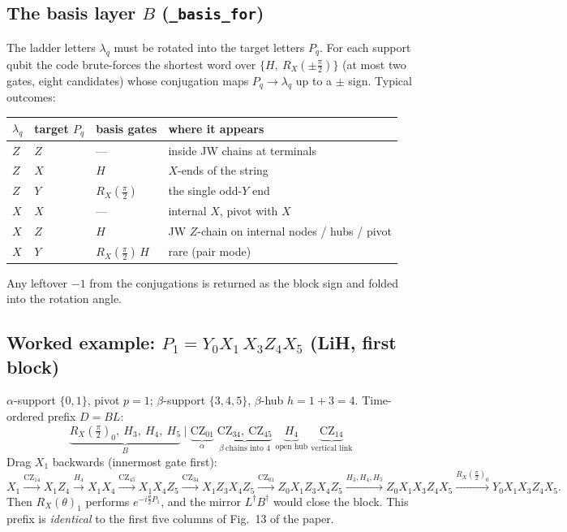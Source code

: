 \documentclass[11pt]{article}
\newcommand{\RX}{R_X}
\newcommand{\CZ}{\mathrm{CZ}}
\newcommand{\code}[1]{\texttt{#1}}
\begin{document}
\subsection{The basis layer $B$ (\code{\_basis\_for})}
The ladder letters $\lambda_q$ must be rotated into the target letters
$P_q$. For each support qubit the code brute-forces the shortest word
over $\{H,\ \RX(\pm\frac{\pi}{2})\}$ (at most two gates, eight
candidates) whose conjugation maps $P_q \to \lambda_q$ up to a $\pm$
sign. Typical outcomes:
\begin{center}
\begin{tabular}{llll}
\toprule
$\lambda_q$ & target $P_q$ & basis gates & where it appears\\
\midrule
$Z$ & $Z$ & --- & inside JW chains at terminals\\
$Z$ & $X$ & $H$ & $X$-ends of the string\\
$Z$ & $Y$ & $\RX(\frac{\pi}{2})$ & the single odd-$Y$ end\\
$X$ & $X$ & --- & internal $X$, pivot with $X$\\
$X$ & $Z$ & $H$ & JW $Z$-chain on internal nodes / hubs / pivot\\
$X$ & $Y$ & $\RX(\frac{\pi}{2})\,H$ & rare (pair mode)\\
\bottomrule
\end{tabular}
\end{center}
Any leftover $-1$ from the conjugations is returned as the block sign and
folded into the rotation angle.

\subsection{Worked example: $P_1 = Y_0X_1\,X_3Z_4X_5$ (LiH, first block)}
$\alpha$-support $\{0,1\}$, pivot $p=1$; $\beta$-support $\{3,4,5\}$,
$\beta$-hub $h=1+3=4$. Time-ordered prefix $D=BL$:
\begin{equation*}
\underbrace{\RX(\tfrac{\pi}{2})_0,\ H_3,\ H_4,\ H_5}_{B}\;\Big|\;
\underbrace{\CZ_{01}}_{\alpha}\;
\underbrace{\CZ_{34},\ \CZ_{45}}_{\beta\ \text{chains into }4}\;
\underbrace{H_4}_{\text{open hub}}\;
\underbrace{\CZ_{14}}_{\text{vertical link}}
\end{equation*}
Drag $X_1$ backwards (innermost gate first):
\begin{equation*}
X_1
\xrightarrow{\CZ_{14}} X_1Z_4
\xrightarrow{H_4} X_1X_4
\xrightarrow{\CZ_{45}} X_1X_4Z_5
\xrightarrow{\CZ_{34}} X_1Z_3X_4Z_5
\xrightarrow{\CZ_{01}} Z_0X_1Z_3X_4Z_5
\xrightarrow{H_3,H_4,H_5} Z_0X_1X_3Z_4X_5
\xrightarrow{\RX(\frac{\pi}{2})_0} Y_0X_1X_3Z_4X_5 .
\end{equation*}
Then $\RX(\theta)_1$ performs $e^{-i\frac{\theta}{2}P_1}$, and the mirror
$L^{\dagger}B^{\dagger}$ would close the block. This prefix is
\emph{identical} to the first five columns of Fig.~13 of the paper.
\end{document}
